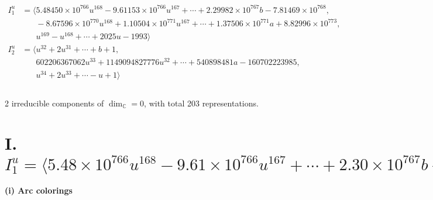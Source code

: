 \documentclass[1p]{elsarticle_modified}
\theoremstyle{definition}
\begin{document}
\begin{align*}
I^u_{1}&=\langle 
5.48450\times10^{766} u^{168}-9.61153\times10^{766} u^{167}+\cdots+2.29982\times10^{767} b-7.81469\times10^{768},\\
\phantom{I^u_{1}}&\phantom{= \langle  }-8.67596\times10^{770} u^{168}+1.10504\times10^{771} u^{167}+\cdots+1.37506\times10^{771} a+8.82996\times10^{773},\\
\phantom{I^u_{1}}&\phantom{= \langle  }u^{169}- u^{168}+\cdots+2025 u-1993\rangle \\
I^u_{2}&=\langle 
u^{32}+2 u^{31}+\cdots+b+1,\\
\phantom{I^u_{2}}&\phantom{= \langle  }602206367062 u^{33}+1149094827776 u^{32}+\cdots+540898481 a-160702223985,\\
\phantom{I^u_{2}}&\phantom{= \langle  }u^{34}+2 u^{33}+\cdots- u+1\rangle \\
\\
\end{align*}
\raggedright * 2 irreducible components of $\dim_{\mathbb{C}}=0$, with total 203 representations.\\
\newpage
\renewcommand{\arraystretch}{1}
\centering \section*{I. $I^u_{1}= \langle 5.48\times10^{766} u^{168}-9.61\times10^{766} u^{167}+\cdots+2.30\times10^{767} b-7.81\times10^{768},\;-8.68\times10^{770} u^{168}+1.11\times10^{771} u^{167}+\cdots+1.38\times10^{771} a+8.83\times10^{773},\;u^{169}- u^{168}+\cdots+2025 u-1993 \rangle$}
\flushleft \textbf{(i) Arc colorings}\\
\end{document}
